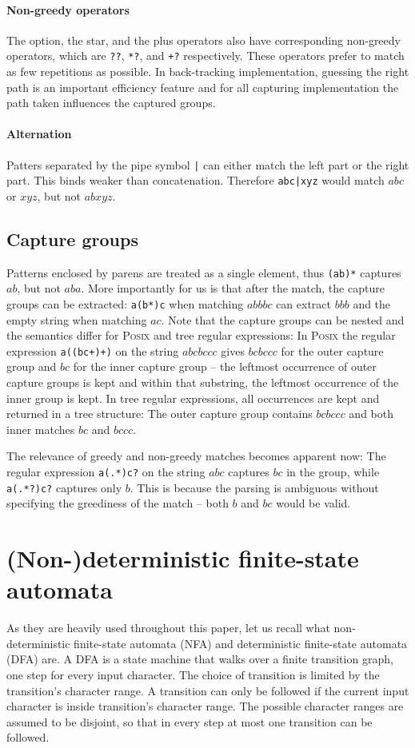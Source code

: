 \documentclass[11pt]{Thesis}
\theoremstyle{definition}
\begin{document}
\paragraph{Non-greedy operators} The option, the star, and the plus operators 
also have corresponding non-greedy operators, which are \texttt{??}, 
\texttt{*?}, and \texttt{+?} respectively. These operators prefer to match as 
few repetitions as possible. In back-tracking implementation, guessing the 
right path is an important efficiency feature and for all capturing 
implementation the path taken influences the captured groups.

\paragraph{Alternation} Patters separated by the pipe symbol \texttt{|} can 
either match the left part or the right part. This binds weaker than 
concatenation. Therefore \texttt{abc|xyz} would match $abc$ or $xyz$, but not
$abxyz$.

\subsection{Capture groups}
Patterns enclosed by parens are treated as a single element, thus
\texttt{(ab)*} captures $ab$, but not $aba$. More importantly for us is that
after the match, the capture groups can be extracted: \texttt{a(b*)c} when
matching $abbbc$ can extract $bbb$ and the empty string when matching $ac$.
Note that the capture groups can be nested and the semantics differ for
\textsc{Posix} and tree regular expressions: In \textsc{Posix} the regular expression
\texttt{a((bc+)+)} on the string $abcbccc$ gives $bcbccc$ for the outer
capture group and $bc$ for the inner capture group -- the leftmost occurrence of
outer capture groups is kept and within that substring, the leftmost occurrence
of the inner group is kept. In tree regular expressions, all occurrences are kept and returned
in a tree structure: The outer capture group contains $bcbccc$ and both inner
matches $bc$ and $bccc$.

The relevance of greedy and non-greedy matches becomes apparent now: The
regular expression \texttt{a(.*)c?} on the string $abc$ captures $bc$ in
the group, while \texttt{a(.*?)c?} captures only $b$. This is because 
the parsing is ambiguous without specifying the greediness of the match -- both
$b$ and $bc$ would be valid.

\section{(Non-)deterministic finite-state automata}
As they are heavily used throughout this paper, let us recall what
non-deterministic finite-state automata (NFA) and deterministic finite-state
automata (DFA) are. A DFA is a state machine that walks over a finite
transition graph, one step for every input character. The choice of transition
is limited by the transition's character range. A transition can only be
followed if the current input character is inside transition's character 
range. The possible character ranges are assumed to be disjoint, so that in 
every step at most one transition can be followed.
\end{document}
